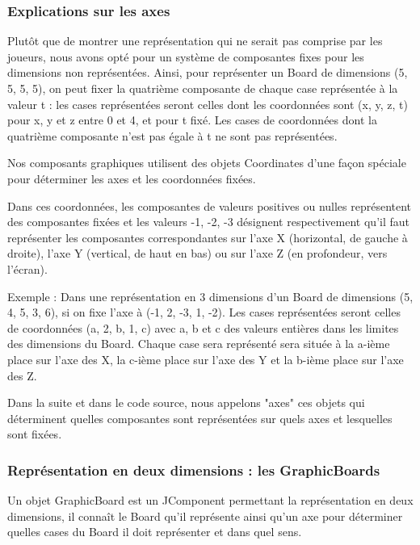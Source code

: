 \subsubsection{Explications sur les axes}

	Plutôt que de montrer une représentation qui ne serait pas comprise par les joueurs, nous avons opté pour un système de composantes fixes pour les dimensions non représentées. Ainsi, pour représenter un Board de dimensions (5, 5, 5, 5), on peut fixer la quatrième composante de chaque case représentée à la valeur t : les cases représentées seront celles dont les coordonnées sont (x, y, z, t) pour x, y et z entre 0 et 4, et pour t fixé. Les cases de coordonnées dont la quatrième composante n'est pas égale à t ne sont pas représentées.
\newline

	Nos composants graphiques utilisent des objets Coordinates d'une façon spéciale pour déterminer les axes et les coordonnées fixées.
	\newline	
	
	Dans ces coordonnées, les composantes de valeurs positives ou nulles représentent des composantes fixées et les valeurs -1, -2, -3 désignent respectivement qu'il faut représenter les composantes correspondantes sur l'axe X (horizontal, de gauche à droite), l'axe Y (vertical, de haut en bas) ou sur l'axe Z (en profondeur, vers l'écran).
\newline
	
	Exemple : Dans une représentation en 3 dimensions d'un Board de dimensions (5, 4, 5, 3, 6), si on fixe l'axe à (-1, 2, -3, 1, -2). Les cases représentées seront celles de coordonnées (a, 2, b, 1, c) avec a, b et c des valeurs entières dans les limites des dimensions du Board.
Chaque case sera représenté sera située à la a-ième place sur l'axe des X, la c-ième place sur l'axe des Y et la b-ième place sur l'axe des Z.
\newline

	Dans la suite et dans le code source, nous appelons "axes" ces objets qui déterminent quelles composantes sont représentées sur quels axes et lesquelles sont fixées.

\subsubsection{Représentation en deux dimensions : les GraphicBoards}


	Un objet GraphicBoard est un JComponent permettant la représentation en deux dimensions, il connaît le Board qu'il représente ainsi qu'un axe pour déterminer quelles cases du Board il doit représenter et dans quel sens. \newline

